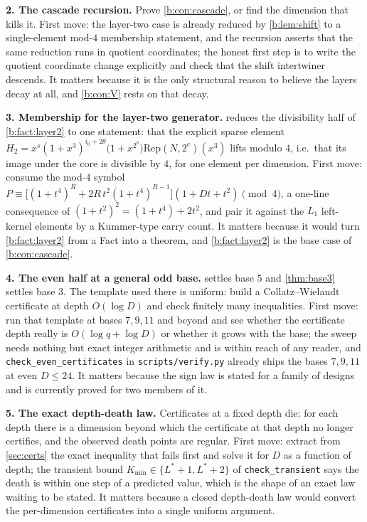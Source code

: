 \documentclass[11pt]{amsart}
\theoremstyle{definition}
\theoremstyle{remark}
\begin{document}
\textbf{2. The cascade recursion.} Prove \cref{b:con:cascade}, or find the dimension that kills it. First move: the layer-two case is already reduced by \cref{b:lem:shift} to a single-element mod-$4$ membership statement, and the recursion asserts that the same reduction runs in quotient coordinates; the honest first step is to write the quotient coordinate change explicitly and check that the shift intertwiner descends. It matters because it is the only structural reason to believe the layers decay at all, and \cref{b:con:V} rests on that decay.

\textbf{3. Membership for the layer-two generator.}  reduces the divisibility half of \cref{b:fact:layer2} to one statement: that the explicit sparse element $H_2 = x^s(1+x^3)^{i_0+2\theta}\bigl(1+x^{2^b}\bigr)\mathrm{Rep}(N,2^e)(x^3)$ lifts modulo $4$, i.e.\ that its image under the core is divisible by $4$, for one element per dimension. First move: consume the mod-$4$ symbol $P \equiv \bigl[(1+t^4)^R + 2R\,t^2(1+t^4)^{R-1}\bigr](1+Dt+t^2) \pmod 4$, a one-line consequence of $(1+t^2)^2 = (1+t^4)+2t^2$, and pair it against the $L_1$ left-kernel elements by a Kummer-type carry count. It matters because it would turn \cref{b:fact:layer2} from a Fact into a theorem, and \cref{b:fact:layer2} is the base case of \cref{b:con:cascade}.

\textbf{4. The even half at a general odd base.}  settles base $5$ and \cref{thm:base3} settles base $3$. The template used there is uniform: build a Collatz--Wielandt certificate at depth $O(\log D)$ and check finitely many inequalities. First move: run that template at bases $7, 9, 11$ and beyond and see whether the certificate depth really is $O(\log q + \log D)$ or whether it grows with the base; the sweep needs nothing but exact integer arithmetic and is within reach of any reader, and \texttt{check\_even\_certificates} in \texttt{scripts/verify.py} already ships the bases $7, 9, 11$ at even $D \le 24$. It matters because the sign law is stated for a family of designs and is currently proved for two members of it.

\textbf{5. The exact depth-death law.} Certificates at a fixed depth die: for each depth there is a dimension beyond which the certificate at that depth no longer certifies, and the observed death points are regular. First move: extract from \cref{sec:certs} the exact inequality that fails first and solve it for $D$ as a function of depth; the transient bound $K_{\min} \in \{L^*+1, L^*+2\}$ of \texttt{check\_transient} says the death is within one step of a predicted value, which is the shape of an exact law waiting to be stated. It matters because a closed depth-death law would convert the per-dimension certificates into a single uniform argument.
\end{document}
